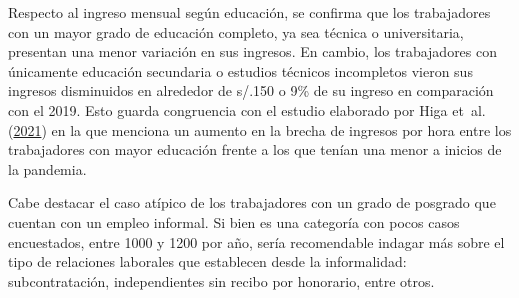 \documentclass[
  letterpaper,
  12pt,
  oneside,
  spanish,
  doublespacing,
  headsepline,
  parskip]{MastersDoctoralThesis}
\begin{document}
Respecto al ingreso mensual según educación, se confirma que los
trabajadores con un mayor grado de educación completo, ya sea técnica o
universitaria, presentan una menor variación en sus ingresos. En cambio,
los trabajadores con únicamente educación secundaria o estudios técnicos
incompletos vieron sus ingresos disminuidos en alrededor de s/.150 o 9\%
de su ingreso en comparación con el 2019. Esto guarda congruencia con el
estudio elaborado por Higa et~al.
(\protect\hyperlink{ref-higa2021}{2021}) en la que menciona un aumento
en la brecha de ingresos por hora entre los trabajadores con mayor
educación frente a los que tenían una menor a inicios de la pandemia.

Cabe destacar el caso atípico de los trabajadores con un grado de
posgrado que cuentan con un empleo informal. Si bien es una categoría
con pocos casos encuestados, entre 1000 y 1200 por año, sería
recomendable indagar más sobre el tipo de relaciones laborales que
establecen desde la informalidad: subcontratación, independientes sin
recibo por honorario, entre otros.
\end{document}
